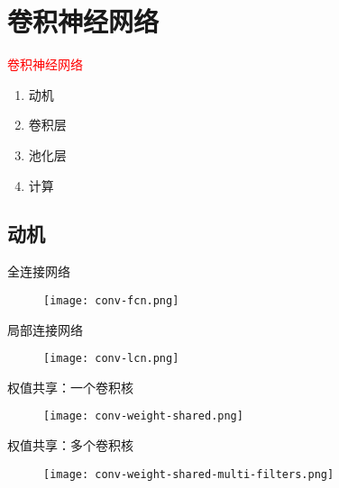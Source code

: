 \section{卷积神经网络}
\label{sec:cnn}

\begin{frame}
  \begin{center}
    \Huge{\textcolor{red}{卷积神经网络}}
  \end{center}

  \begin{enumerate}
    \item \alert{动机}
    \item \alert{卷积层}
    \item \alert{池化层}
    \item \alert{计算}    
  \end{enumerate}
\end{frame}

\subsection{动机}

\begin{frame}[fragile]{全连接网络}
  \begin{figure}
    \centering
    \texttt{[image: conv-fcn.png]}
  \end{figure}
\end{frame}

\begin{frame}[fragile]{局部连接网络}
  \begin{figure}
    \centering
    \texttt{[image: conv-lcn.png]}
  \end{figure}
\end{frame}

\begin{frame}[fragile]{权值共享：一个卷积核}
  \begin{figure}
    \centering
    \texttt{[image: conv-weight-shared.png]}
  \end{figure}
\end{frame}

\begin{frame}[fragile]{权值共享：多个卷积核}
  \begin{figure}
    \centering
    \texttt{[image: conv-weight-shared-multi-filters.png]}
  \end{figure}
\end{frame}

